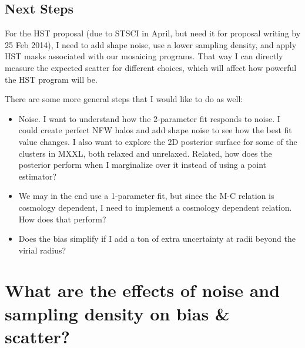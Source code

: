 \documentclass[11pt]{article}
\begin{document}

\subsection{Next Steps}

For the HST proposal (due to STSCI in April, but need it for proposal writing by 25 Feb 2014), I need to add shape noise, use a lower sampling density, and apply HST masks associated with our mosaicing programs. That way I can directly measure the expected scatter for different choices, which will affect how powerful the HST program will be. 

There are some more general steps that I would like to do as well:
\begin{itemize}
\item Noise. I want to understand how the 2-parameter fit responds to noise. I could create perfect NFW halos and add shape noise to see how the best fit value changes. I also want to explore the 2D posterior surface for some of the clusters in MXXL, both relaxed and unrelaxed. Related, how does the posterior perform when I marginalize over it instead of using a point estimator?
\item We may in the end use a 1-parameter fit, but since the M-C relation is cosmology dependent, I need to implement a cosmology dependent relation. How does that perform?
\item Does the bias simplify if I add a ton of extra uncertainty at radii beyond the virial radius?
\end{itemize}



\clearpage \newpage

\section{What are the effects of noise and sampling density on bias \& scatter?}
\label{sec:noisebias}
\end{document}
